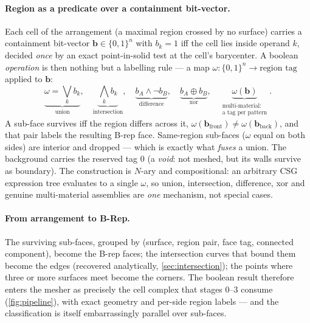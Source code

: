 \documentclass[11pt,a4paper]{article}
\numberwithin{equation}{section}
\newcommand{\vv}[1]{\mathbf{#1}}
\begin{document}
\paragraph{Region as a predicate over a containment bit-vector.}
Each cell of the arrangement (a maximal region crossed by no surface) carries a
containment bit-vector $\vv{b}\in\{0,1\}^n$ with $b_k=1$ iff the cell lies inside
operand $k$, decided \emph{once} by an exact point-in-solid test at the cell's
barycenter. A boolean \emph{operation} is then nothing but a labelling rule --- a
map $\omega:\{0,1\}^n\to\text{region tag}$ applied to $\vv{b}$:
\begin{equation}
\label{eq:regionpred}
\underbrace{\omega=\textstyle\bigvee_k b_k}_{\text{union}},\quad
\underbrace{\textstyle\bigwedge_k b_k}_{\text{intersection}},\quad
\underbrace{b_A\wedge\neg b_B}_{\text{difference}},\quad
\underbrace{b_A\oplus b_B}_{\text{xor}},\quad
\underbrace{\omega(\vv{b})}_{\substack{\text{multi-material:}\\\text{a tag per pattern}}} .
\end{equation}
A sub-face survives iff the region differs across it,
$\omega(\vv{b}_{\text{front}})\neq\omega(\vv{b}_{\text{back}})$, and that pair
labels the resulting B-rep face. Same-region sub-faces ($\omega$ equal on both
sides) are interior and dropped --- which is exactly what \emph{fuses} a union.
The background carries the reserved tag $0$ (a \emph{void}: not meshed, but its
walls survive as boundary). The construction is $N$-ary and compositional: an
arbitrary CSG expression tree evaluates to a single $\omega$, so union,
intersection, difference, xor and genuine multi-material assemblies are
\emph{one} mechanism, not special cases.

\paragraph{From arrangement to B-Rep.}
The surviving sub-faces, grouped by (surface, region pair, face tag, connected
component), become the B-rep faces; the intersection curves that bound them
become the edges (recovered analytically, \cref{sec:intersection}); the points
where three or more surfaces meet become the corners. The boolean result
therefore enters the mesher as precisely the cell complex that stages $0$--$3$
consume (\cref{fig:pipeline}), with exact geometry and per-side region labels ---
and the classification is itself embarrassingly parallel over sub-faces.
\end{document}
